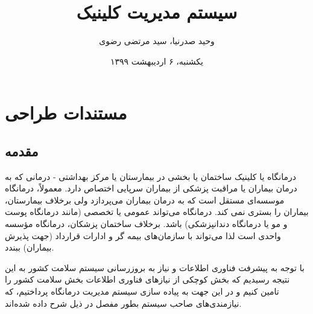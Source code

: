 \documentclass[a4paper,12pt]{report}
\begin{document}
	
	\renewcommand{\bibname}{مراجع}
	
	\title{
		سیستم مدیریت کلینیک
	}
	\author{
		وحید صدرنیا، سید مرتضی رضوی
	}
	\date{
		یکشنبه، ۶ اردیبهشت ۱۳۹۹
	}

	\tableofcontents
	\maketitle
	\chapter{
	مستندات طراحی}
	\section*{
		مقدمه}
	\label{chap13}
	
	درمانگاه یا کلینیک 
	ساختمان یا بخشی در بیمارستان یا مرکز بهداشتی - درمانی که به درمان بیماران یا مراقبت پزشکی از بیماران سرپایی اختصاص دارد. معمولاً، درمانگاه موسسه‌ای مستقل است که به درمان بیماران می‌پردازد ولی برخلاف بیمارستان، بیماران را بستری نمی کند. درمانگاه می‌تواند عمومی یا تخصصی (مانند درمانگاه پوست و مو یا درمانگاه دندانپزشکی) باشد. برخلاف ساختمان پزشکان، درمانگاه مؤسسه واحدی است لذا می‌تواند با سازمان‌های بیمه گر و ادارات قرارداد (جهت پذیرش بیماران) ببندد.
	
	با توجه به پیشرفت فناوری اطلاعات و نیاز به بروزرسانی سیستم سلامت کشور به این نتیجه رسیدیم که بخش کوچکی از نیازهای فناوری اطلاعات بخش سلامت کشور را تامین کنیم و در این جهت به  پیاده سازی سیستم مدیریت درمانگاه پرداختیم، که نیازمندی‌های صاحب سیستم بطور مفصل در ذیل شرح داده شده‌اند.
	
\end{document}
